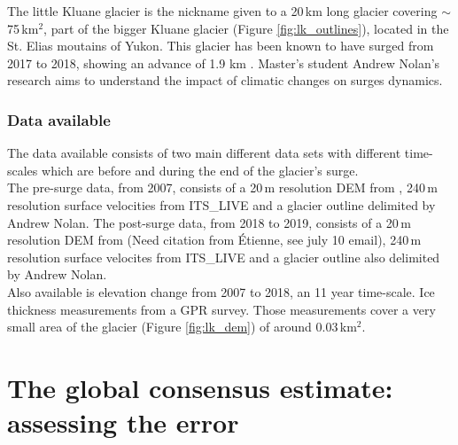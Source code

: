 \documentclass[a4, 12pt]{article}
\newcommand{\citeg}[1]{\citep[e.g.][]{#1}}
\newcommand{\fref}[1]{(Figure \ref{#1})}
\begin{document}
The little Kluane glacier is the nickname given to a 20\,km long glacier covering $\sim$75\,km$^2$, part of the bigger Kluane glacier \fref{fig:lk_outlines}, located in the St. Elias moutains of Yukon. This glacier has been known to have surged from 2017 to 2018, showing an advance of 1.9 km \citep{main2019surge}. Master's student Andrew Nolan's research aims to understand the impact of climatic changes on surges dynamics.  

\FloatBarrier

\subsubsection{Data available}
The data available consists of two main different data sets with different time-scales which are before and during the end of the glacier's surge.
\\
The pre-surge data, from 2007, consists of a 20\,m resolution DEM from \citet{berthier2008spot5}, 240\,m resolution surface velocities from ITS\_LIVE \citeg{gardner2019its_live} and a glacier outline delimited by Andrew Nolan.
The post-surge data, from 2018 to 2019, consists of a 20\,m resolution DEM from (Need citation from Étienne, see july 10 email), 240\,m resolution surface velocites from ITS\_LIVE \citeg{gardner2019its_live} and a glacier outline also delimited by Andrew Nolan. 
\\

Also available is elevation change from 2007 to 2018, an 11 year time-scale. Ice thickness measurements from a GPR survey. Those measurements cover a very small area of the glacier \fref{fig:lk_dem} of around 0.03\,km$^2$.

\FloatBarrier

\section{The global consensus estimate: assessing the error}
\end{document}
